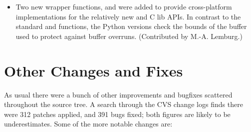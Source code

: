 \documentclass{howto}
\begin{document}
\begin{itemize}
\item
   Two new wrapper functions,  and
    were added to provide 
   cross-platform implementations for the relatively new
    and  C lib APIs. In
   contrast to the standard  and
    functions, the Python versions check the
   bounds of the buffer used to protect against buffer overruns.
   (Contributed by M.-A. Lemburg.)

\end{itemize}


\section{Other Changes and Fixes}

As usual there were a bunch of other improvements and bugfixes
scattered throughout the source tree.  A search through the CVS change
logs finds there were 312 patches applied, and 391 bugs fixed; both
figures are likely to be underestimates.  Some of the more notable
changes are:
\end{document}
